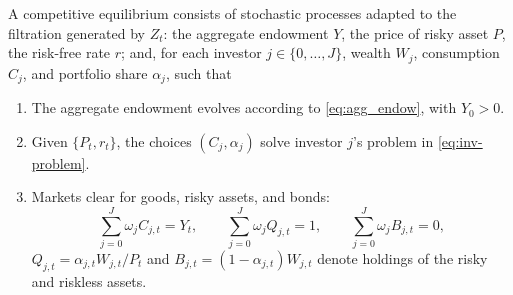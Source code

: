 \begin{defn}
A competitive equilibrium consists of stochastic processes adapted to the filtration generated by $Z_t$: the aggregate endowment $Y$, the price of risky asset $P$, the risk-free rate $r$; and, for each investor $j \in \{0,\ldots,J\}$, wealth $W_j$, consumption $C_j$, and portfolio share $\alpha_j$, such that
\begin{enumerate}[label=(\roman*)]
    \item The aggregate endowment evolves according to \eqref{eq:agg_endow}, with $Y_0 > 0$.
    \item Given $\{P_t, r_t\}$, the choices $(C_j,\alpha_j)$ solve investor $j$'s problem in \eqref{eq:inv-problem}.
    \item Markets clear for goods, risky assets, and bonds:
    \begin{equation}
        \sum_{j=0}^J \omega_j C_{j,t} = Y_t, 
        \qquad 
        \sum_{j=0}^J \omega_j Q_{j,t} = 1, 
        \qquad 
        \sum_{j=0}^J \omega_j B_{j,t} = 0,
    \end{equation}
    $Q_{j,t} = \alpha_{j,t} W_{j,t} / P_t$ and $B_{j,t} = (1-\alpha_{j,t}) W_{j,t}$ denote holdings of the risky and riskless assets. 
\end{enumerate}
\end{defn}




